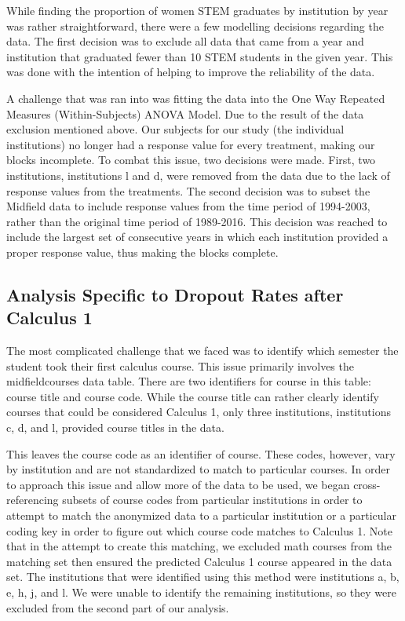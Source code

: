 \documentclass[]{article}
\begin{document}
While finding the proportion of women STEM graduates by institution by
year was rather straightforward, there were a few modelling decisions
regarding the data. The first decision was to exclude all data that came
from a year and institution that graduated fewer than 10 STEM students
in the given year. This was done with the intention of helping to
improve the reliability of the data.

A challenge that was ran into was fitting the data into the One Way
Repeated Measures (Within-Subjects) ANOVA Model. Due to the result of
the data exclusion mentioned above. Our subjects for our study (the
individual institutions) no longer had a response value for every
treatment, making our blocks incomplete. To combat this issue, two
decisions were made. First, two institutions, institutions l and d, were
removed from the data due to the lack of response values from the
treatments. The second decision was to subset the Midfield data to
include response values from the time period of 1994-2003, rather than
the original time period of 1989-2016. This decision was reached to
include the largest set of consecutive years in which each institution
provided a proper response value, thus making the blocks complete.

\subsection{Analysis Specific to Dropout Rates after Calculus
1}\label{analysis-specific-to-dropout-rates-after-calculus-1}

The most complicated challenge that we faced was to identify which
semester the student took their first calculus course. This issue
primarily involves the midfieldcourses data table. There are two
identifiers for course in this table: course title and course code.
While the course title can rather clearly identify courses that could be
considered Calculus 1, only three institutions, institutions c, d, and
l, provided course titles in the data.

This leaves the course code as an identifier of course. These codes,
however, vary by institution and are not standardized to match to
particular courses. In order to approach this issue and allow more of
the data to be used, we began cross-referencing subsets of course codes
from particular institutions in order to attempt to match the anonymized
data to a particular institution or a particular coding key in order to
figure out which course code matches to Calculus 1. Note that in the
attempt to create this matching, we excluded math courses from the
matching set then ensured the predicted Calculus 1 course appeared in
the data set. The institutions that were identified using this method
were institutions a, b, e, h, j, and l. We were unable to identify the
remaining institutions, so they were excluded from the second part of
our analysis.
\end{document}
